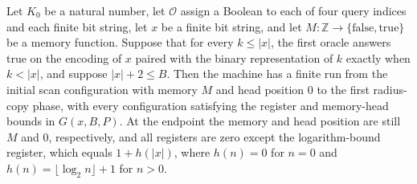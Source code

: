 \begin{theorem}
\label{Complexity.LogProg.ExpBFS.setup_run}
\leanok
{}
Let $K_0$ be a natural number, let $\mathcal O$ assign a Boolean to each of four query
indices and each finite bit string, let $x$ be a finite bit string, and let $M:\mathbb
Z\to\{\mathrm{false},\mathrm{true}\}$ be a memory function. Suppose that for every $k\le
|x|$, the first oracle answers true on the encoding of $x$ paired with the binary
representation of $k$ exactly when $k<|x|$, and suppose $|x|+2\le B$. Then the machine
has a finite run from the initial scan configuration with memory $M$ and head position
$0$ to the first radius-copy phase, with every configuration satisfying the register and
memory-head bounds in $G(x,B,P)$. At the endpoint the memory and head position are still
$M$ and $0$, respectively, and all registers are zero except the logarithm-bound
register, which equals $1+h(|x|)$, where $h(n)=0$ for $n=0$ and $h(n)=\lfloor\log_2
n\rfloor+1$ for $n>0$.
\end{theorem}

